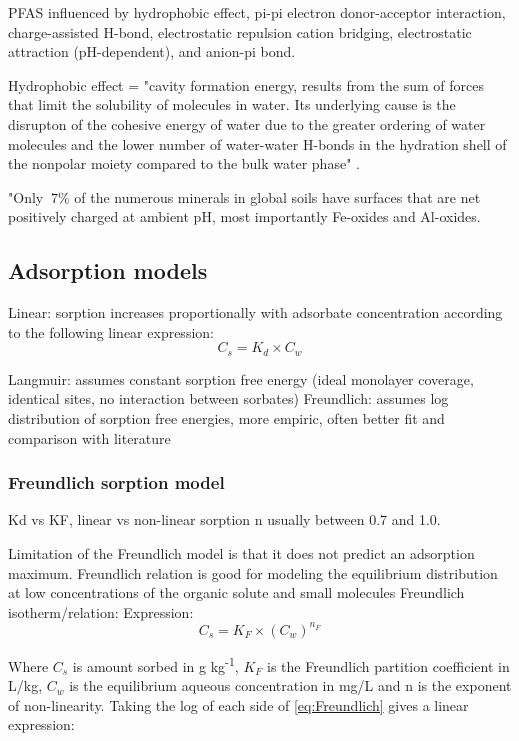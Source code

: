 PFAS influenced by hydrophobic effect, pi-pi electron donor-acceptor interaction, charge-assisted H-bond, electrostatic repulsion
cation bridging, electrostatic attraction (pH-dependent), and anion-pi bond.

Hydrophobic effect = "cavity formation energy, results from the sum of forces that limit the solubility of molecules in water. Its underlying cause is the disrupton of the cohesive energy of water due to the greater ordering of water molecules and the lower number of water-water H-bonds in the hydration shell of the nonpolar moiety compared to the bulk water phase" \citep{sigmund2022sorption}.

"Only $~7\%$ of the numerous minerals in global soils have surfaces that are net positively charged at ambient pH, most importantly Fe-oxides and Al-oxides. 

\subsection{Adsorption models}
Linear: sorption increases proportionally with adsorbate concentration according to the following linear expression:
\begin{equation}\label{linear}
C_s = K_d \times C_w
\end{equation}

Langmuir: assumes constant sorption free energy (ideal monolayer coverage, identical sites, no interaction between sorbates)
Freundlich: assumes log distribution of sorption free energies, more empiric, often better fit and comparison with literature


\subsubsection{Freundlich sorption model}
Kd vs KF, linear vs non-linear sorption
n usually between 0.7 and 1.0. 

Limitation of the Freundlich model is that it does not predict an adsorption maximum. 
Freundlich relation is good for modeling the equilibrium distribution at low concentrations of the organic solute and small molecules \citep{vanloon2017Ch14}
Freundlich isotherm/relation: 
Expression:
\begin{equation} \label{eq:Freundlich}
    C_s = K_F \times (C_{w})^{n_F}
\end{equation}

Where $C_s$ is amount sorbed in \textmu g kg\textsuperscript{-1}, $K_F$ is the Freundlich partition coefficient in L/kg, $C_{w}$ is the equilibrium aqueous concentration in mg/L and n is the exponent of non-linearity. Taking the log of each side of \cref{eq:Freundlich} gives a linear expression:

